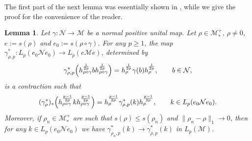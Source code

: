 \documentclass[12pt]{article}
\newtheorem{lemma}[theorem]{Lemma}
\theoremstyle{definition}
\theoremstyle{remark}
\numberwithin{equation}{section}
\def\Me{\mathcal M}
\def\Ne{\mathcal N}
\begin{document}
{The first part of the next lemma was essentially shown in
\cite[Proposition 3.12]{jencova2018renyi}, while we give the proof for the convenience of the reader.}

\begin{lemma}\label{lemma:pcontraction} Let $\gamma:\Ne\to \Me$ be a normal positive unital map.
Let $\rho\in \Me_*^+$, {$\rho\ne0$,} $e:=s(\rho)$ and $e_0:=s(\rho\circ\gamma)$. For any
$p\ge 1$, the map $\gamma^*_{\rho,p}:L_p(e_0 \Ne e_0)\to L_p(e\Me e)$, determined by
\begin{align}\label{gamma-rho-p1}
\gamma^*_{\rho,p}\Bigl(h_{\rho\circ\gamma}^{1\over 2p}bh^{1\over2p}_{\rho\circ\gamma}\Bigr)
=h_\rho^{1\over 2p}\gamma(b) h_\rho^{1\over 2p},\qquad b\in \Ne,
\end{align}
is a contraction such that 
\begin{align}\label{gamma-rho-p2}
(\gamma^*_\rho)_*\Bigl(h_{\rho\circ\gamma}^{p-1\over 2p}k
h_{\rho\circ\gamma}^{p-1\over2p}\Bigr)
=h_\rho^{p-1\over 2p}\gamma^*_{\rho,p}(k)h_\rho^{p-1\over 2p},\qquad
k\in L_p(e_0 \Ne e_0).
\end{align}
Moreover, if $\rho_n\in \Me_*^+$ are such that $s(\rho)\le s(\rho_n)$ and
$\|\rho_n-\rho\|_1\to 0$, then for any $k\in L_p(e_0 \Ne e_0)$ we have
$\gamma^*_{\rho_n,p}(k)\to \gamma^*_{\rho,p}(k)$ in $L_p(\Me)$.

\end{lemma}
\end{document}
